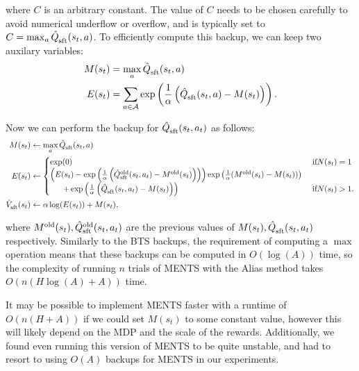 \documentclass{article}
\newcommand{\cl}[1]{\mathcal{#1}}
\newcommand{\Vst}[2]{\hat{V}^{#2}_{\textnormal{sft}}(#1)}
\newcommand{\Qst}[3]{\hat{Q}^{#3}_{\textnormal{sft}}(#1,#2)}
\theoremstyle{plain}
\begin{document}
\begin{appendices}
            where $C$ is an arbitrary constant. The value of $C$ needs to be chosen carefully to avoid numerical underflow or overflow, and is typically set to $C=\max_a \Qst{s_t}{a}{}$. To efficiently compute this backup, we can keep two auxilary variables:
            \begin{align}
            		M(s_t) &= \max_a \Qst{s_t}{a}{} \\
            		E(s_t) &= \sum_{a\in\cl{A}} \exp \left(\frac{1}{\alpha}\left(\Qst{s_t}{a}{} - M(s_t) \right)\right).
            \end{align}
            
            Now we can perform the backup for $\Qst{s_t}{a_t}{}$ as follows:
            \begin{align}
            		M(s_t) &\leftarrow \max_a \Qst{s_t}{a}{} \\
            		E(s_t) &\leftarrow
            			\begin{cases}
            				\exp(0)	& \text{ if} N(s_t)=1 \\
            				\left(
            					E(s_t) - \exp 
            					\left(
            						\frac{1}{\alpha}
            						\left(
            							\Qst{s_t}{a_t}{\text{old}} - M^{\text{old}}(s_t) 
            						\right)
            					\right)
            				\right)
            				\exp
            				\left(
            					\frac{1}{\alpha} (M^{\text{old}}(s_t)-M(s_t))
            				\right) \\
            				\ \ \ \ \ + \exp 
            				\left(
            					\frac{1}{\alpha}
            					\left(
            						\Qst{s_t}{a_t}{} - M(s_t) 
            					\right) 
            				\right)
            				& \text{ if} N(s_t) > 1.
            			\end{cases} \\
            		\Vst{s_t}{} &\leftarrow  \alpha \log(E(s_t)) + M(s_t), 
            \end{align}
            
            where $M^{\text{old}}(s_t), \Qst{s_t}{a_t}{\text{old}}$ are the previous values of $M(s_t), \Qst{s_t}{a_t}{}$ respectively. Similarly to the BTS backups, the requirement of computing a $\max$ operation means that these backups can be computed in $O(\log(A))$ time, so the complexity of running $n$ trials of MENTS with the Alias method takes $O(n(H\log(A)+A))$ time. 
            
            It may be possible to implement MENTS faster with a runtime of $O(n(H+A))$ if we could set $M(s_t)$ to some constant value, however this will likely depend on the MDP and the scale of the rewards. Additionally, we found even running this version of MENTS to be quite unstable, and had to resort to using $O(A)$ backups for MENTS in our experiments.
        

\end{appendices}
\end{document}
